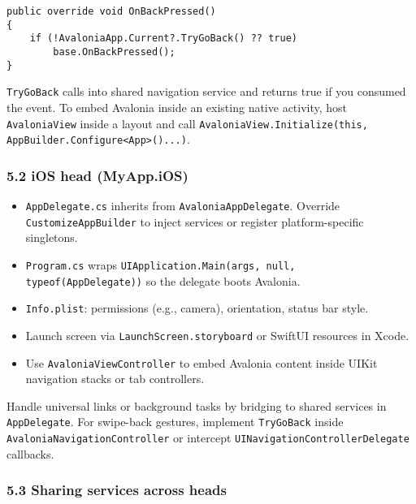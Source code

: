 \begin{lstlisting}
public override void OnBackPressed()
{
    if (!AvaloniaApp.Current?.TryGoBack() ?? true)
        base.OnBackPressed();
}
\end{lstlisting}

\passthrough{\lstinline!TryGoBack!} calls into shared navigation service
and returns true if you consumed the event. To embed Avalonia inside an
existing native activity, host \passthrough{\lstinline!AvaloniaView!}
inside a layout and call
\passthrough{\lstinline!AvaloniaView.Initialize(this, AppBuilder.Configure<App>()...)!}.

\subsubsection{5.2 iOS head (MyApp.iOS)}\label{ios-head-myapp.ios}

\begin{itemize}
\tightlist
\item
  \passthrough{\lstinline!AppDelegate.cs!} inherits from
  \passthrough{\lstinline!AvaloniaAppDelegate!}. Override
  \passthrough{\lstinline!CustomizeAppBuilder!} to inject services or
  register platform-specific singletons.
\item
  \passthrough{\lstinline!Program.cs!} wraps
  \passthrough{\lstinline!UIApplication.Main(args, null, typeof(AppDelegate))!}
  so the delegate boots Avalonia.
\item
  \passthrough{\lstinline!Info.plist!}: permissions (e.g., camera),
  orientation, status bar style.
\item
  Launch screen via \passthrough{\lstinline!LaunchScreen.storyboard!} or
  SwiftUI resources in Xcode.
\item
  Use \passthrough{\lstinline!AvaloniaViewController!} to embed Avalonia
  content inside UIKit navigation stacks or tab controllers.
\end{itemize}

Handle universal links or background tasks by bridging to shared
services in \passthrough{\lstinline!AppDelegate!}. For swipe-back
gestures, implement \passthrough{\lstinline!TryGoBack!} inside
\passthrough{\lstinline!AvaloniaNavigationController!} or intercept
\passthrough{\lstinline!UINavigationControllerDelegate!} callbacks.

\subsubsection{5.3 Sharing services across
heads}\label{sharing-services-across-heads}

